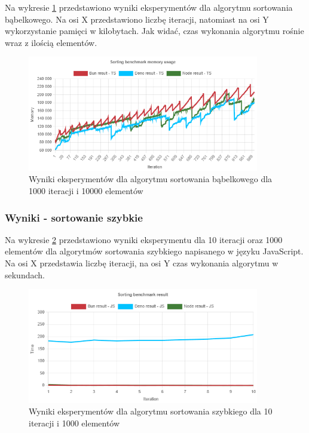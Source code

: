 Na wykresie \ref{fig:bubble_sorting_e6_memory_ts} przedstawiono wyniki eksperymentów dla algorytmu sortowania bąbelkowego. Na osi X przedstawiono liczbę iteracji, natomiast na osi Y wykorzystanie pamięci w kilobytach. Jak widać, czas wykonania algorytmu rośnie wraz z ilością elementów.
\begin{figure}[H]
  \centering
  \includegraphics[width=0.9\textwidth]{Figures/sorting/bubble/e6_memory_ts.png}
  \caption{Wyniki eksperymentów dla algorytmu sortowania bąbelkowego dla 1000 iteracji i 10000 elementów}
  \label{fig:bubble_sorting_e6_memory_ts}
\end{figure}

\subsubsection{Wyniki - sortowanie szybkie}
Na wykresie \ref{fig:quick_sorting_e1_js} przedstawiono wyniki eksperymentu dla 10 iteracji oraz 1000 elementów dla algorytmów sortowania szybkiego napisanego w języku JavaScript. Na osi X przedstawia liczbę iteracji, na osi Y czas wykonania algorytmu w sekundach. 

\begin{figure}[H]
  \centering
  \includegraphics[width=0.9\textwidth]{Figures/sorting/quick/e1_js.png}
  \caption{Wyniki eksperymentów dla algorytmu sortowania szybkiego dla 10 iteracji i 1000 elementów}
  \label{fig:quick_sorting_e1_js}
\end{figure}

